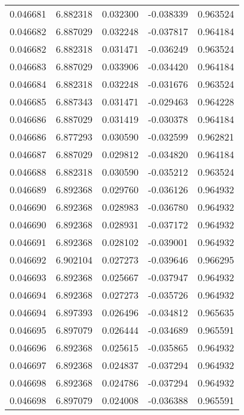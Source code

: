\begin{tabular}{lrrrr}
0.046681    &  6.882318 &  0.032300 & -0.038339 &             0.963524 \\
0.046682    &  6.887029 &  0.032248 & -0.037817 &             0.964184 \\
0.046682    &  6.882318 &  0.031471 & -0.036249 &             0.963524 \\
0.046683    &  6.887029 &  0.033906 & -0.034420 &             0.964184 \\
0.046684    &  6.882318 &  0.032248 & -0.031676 &             0.963524 \\
0.046685    &  6.887343 &  0.031471 & -0.029463 &             0.964228 \\
0.046686    &  6.887029 &  0.031419 & -0.030378 &             0.964184 \\
0.046686    &  6.877293 &  0.030590 & -0.032599 &             0.962821 \\
0.046687    &  6.887029 &  0.029812 & -0.034820 &             0.964184 \\
0.046688    &  6.882318 &  0.030590 & -0.035212 &             0.963524 \\
0.046689    &  6.892368 &  0.029760 & -0.036126 &             0.964932 \\
0.046690    &  6.892368 &  0.028983 & -0.036780 &             0.964932 \\
0.046690    &  6.892368 &  0.028931 & -0.037172 &             0.964932 \\
0.046691    &  6.892368 &  0.028102 & -0.039001 &             0.964932 \\
0.046692    &  6.902104 &  0.027273 & -0.039646 &             0.966295 \\
0.046693    &  6.892368 &  0.025667 & -0.037947 &             0.964932 \\
0.046694    &  6.892368 &  0.027273 & -0.035726 &             0.964932 \\
0.046694    &  6.897393 &  0.026496 & -0.034812 &             0.965635 \\
0.046695    &  6.897079 &  0.026444 & -0.034689 &             0.965591 \\
0.046696    &  6.892368 &  0.025615 & -0.035865 &             0.964932 \\
0.046697    &  6.892368 &  0.024837 & -0.037294 &             0.964932 \\
0.046698    &  6.892368 &  0.024786 & -0.037294 &             0.964932 \\
0.046698    &  6.897079 &  0.024008 & -0.036388 &             0.965591 \\

\end{tabular}
